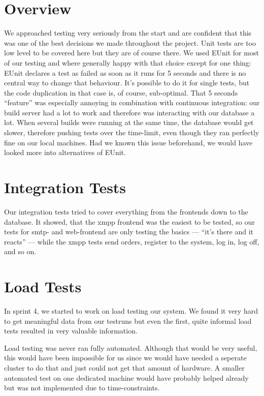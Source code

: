 \documentclass[11pt,a4paper]{report}
\begin{document}
\section{Overview}
We approached testing very seriously from the start and are confident that this
was one of the best decisions we made throughout the project. Unit tests are too
low level to be covered here but they are of course there. We used EUnit for
most of our testing and where generally happy with that choice except for one
thing: EUnit declares a test as failed as soon as it runs for 5 seconds and
there is no central way to change that behaviour. It's possible to do it for
single tests, but the code duplication in that case is, of course, sub-optimal.
That 5 seconds ``feature'' was especially annoying in combination with
continuous integration: our build server had a lot to work and therefore was
interacting with our database a lot. When several builds were running at the
same time, the database would get slower, therefore pushing tests over the
time-limit, even though they ran perfectly fine on our local machines. Had we
known this issue beforehand, we would have looked more into alternatives of
EUnit.

\section{Integration Tests}
Our integration tests tried to cover everything from the frontends down to the
database. It showed, that the xmpp frontend was the easiest to be tested, so
our tests for smtp- and web-frontend are only testing the basics --- ``it's
there and it reacts'' --- while the xmpp tests send orders, register to the 
system, log in, log off, and so on.

\section{Load Tests}
In sprint 4, we started to work on load testing our system. We found it very
hard to get meaningful data from our testruns but even the first, quite informal
load tests resulted in very valuable information.

Load testing was never ran fully automated. Although that would be very useful, 
this would have been impossible for us since we would have needed a seperate
cluster to do that and just could not get that amount of hardware.
A smaller automated test on one dedicated machine would have probably helped
already but was not implemented due to time-constraints.
\end{document}
